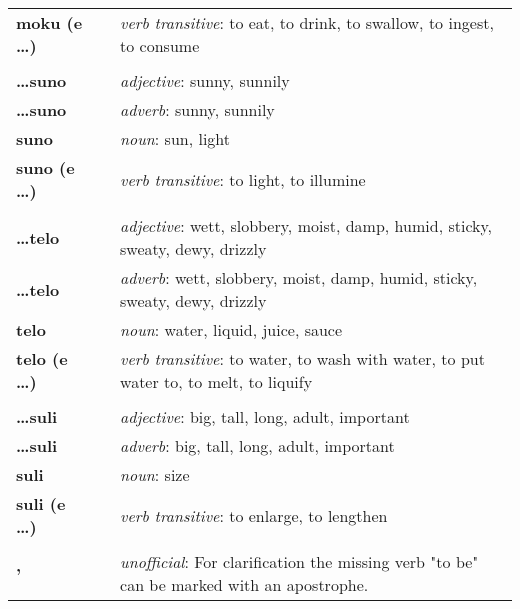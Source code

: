 \begin{supertabular}{p{2,5cm}|ll}
\textbf{moku (e \dots)} && \textit{verb transitive}: to eat, to drink, to swallow, to ingest, to consume \\ %
 && \\ %
\textbf{\dots suno} && \textit{adjective}: sunny, sunnily \\ %
\textbf{\dots suno} && \textit{adverb}: sunny, sunnily \\ %
\textbf{suno} && \textit{noun}: sun, light \\ %
\textbf{suno (e \dots)} && \textit{verb transitive}: to light, to illumine \\ %
 && \\ %
\textbf{\dots telo} && \textit{adjective}: wett, slobbery, moist, damp, humid, sticky, sweaty, dewy, drizzly \\ %
\textbf{\dots telo} && \textit{adverb}: wett, slobbery, moist, damp, humid, sticky, sweaty, dewy, drizzly \\ %
\textbf{telo} && \textit{noun}: water, liquid, juice, sauce \\ %
\textbf{telo (e \dots)} && \textit{verb transitive}: to water, to wash with water, to put water to, to melt, to liquify \\ %
 && \\ %
\textbf{\dots suli} && \textit{adjective}: big, tall, long, adult, important \\ %
\textbf{\dots suli} && \textit{adverb}: big, tall, long, adult, important \\ %
\textbf{suli} && \textit{noun}: size \\ %
\textbf{suli (e \dots)} && \textit{verb transitive}: to enlarge, to lengthen \\ %
 && \\ %
\textbf{'} && \textit{unofficial}: For clarification the missing verb "to be" can be marked with an apostrophe.  \\ %
\end{supertabular} \\
%
\newpage
